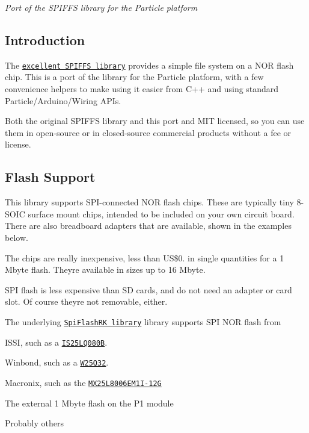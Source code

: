 {\itshape Port of the S\+P\+I\+F\+FS library for the Particle platform}

\subsection*{Introduction}

The \href{https://github.com/pellepl/spiffs}{\tt excellent S\+P\+I\+F\+FS library} provides a simple file system on a N\+OR flash chip. This is a port of the library for the Particle platform, with a few convenience helpers to make using it easier from C++ and using standard Particle/\+Arduino/\+Wiring A\+P\+Is.

Both the original S\+P\+I\+F\+FS library and this port and M\+IT licensed, so you can use them in open-\/source or in closed-\/source commercial products without a fee or license.

\subsection*{Flash Support}

This library supports S\+P\+I-\/connected N\+OR flash chips. These are typically tiny 8-\/\+S\+O\+IC surface mount chips, intended to be included on your own circuit board. There are also breadboard adapters that are available, shown in the examples below.

The chips are really inexpensive, less than US\$0. in single quantities for a 1 Mbyte flash. They\textquotesingle{}re available in sizes up to 16 Mbyte.

S\+PI flash is less expensive than SD cards, and do not need an adapter or card slot. Of course they\textquotesingle{}re not removable, either.

The underlying \href{https://github.com/rickkas7/SpiFlashRK}{\tt Spi\+Flash\+RK library} library supports S\+PI N\+OR flash from


\begin{DoxyItemize}
\item I\+S\+SI, such as a \href{http://www.digikey.com/product-detail/en/issi-integrated-silicon-solution-inc/IS25LQ080B-JNLE/706-1331-ND/5189766}{\tt I\+S25\+L\+Q080B}.
\item Winbond, such as a \href{https://www.digikey.com/product-detail/en/winbond-electronics/W25Q32JVSSIQ/W25Q32JVSSIQ-ND/5803981}{\tt W25\+Q32}.
\item Macronix, such as the \href{https://www.digikey.com/product-detail/en/macronix/MX25L8006EM1I-12G/1092-1117-ND/2744800}{\tt M\+X25\+L8006\+E\+M1\+I-\/12G}
\item The external 1 Mbyte flash on the P1 module
\item Probably others
\end{DoxyItemize}

